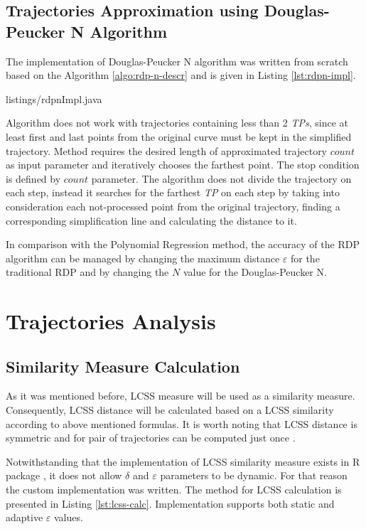 \subsection{Trajectories Approximation using Douglas-Peucker N Algorithm}

The implementation of Douglas-Peucker N algorithm was written from scratch based on the Algorithm \ref{algo:rdp-n-descr} and is given in Listing \ref{lst:rdpn-impl}.

 {listings/rdpnImpl.java}

Algorithm does not work with trajectories containing less than 2 \textit{TPs}, since at least first and last points from the original curve must be kept in the simplified trajectory. Method requires the desired length of approximated trajectory $count$ as input parameter and iteratively chooses the farthest point. The stop condition is defined by $count$ parameter. The algorithm does not divide the trajectory on each step, instead it searches for the farthest \textit{TP} on each step by taking into consideration each not-processed point from the original trajectory, finding a corresponding simplification line and calculating the distance to it. 

In comparison with the Polynomial Regression method, the accuracy of the RDP algorithm can be managed by changing the maximum distance $\varepsilon$ for the traditional RDP and by changing the $N$ value for the Douglas-Peucker N. 

\section{Trajectories Analysis}

\subsection{Similarity Measure Calculation}

As it was mentioned before, LCSS measure will be used as a similarity measure. Consequently, LCSS distance will be calculated based on a LCSS similarity according to above mentioned formulas. It is worth noting that LCSS distance is symmetric and for pair of trajectories can be computed just once \cite{inproceedings:28_lcss_dsmt}.

Notwithstanding that the implementation of LCSS similarity measure exists in R package \cite{online:r_lcss}, it does not allow $\delta$ and $\varepsilon$ parameters to be dynamic. For that reason the custom implementation was written. The method for LCSS calculation is presented in Listing \ref{lst:lcss-calc}. Implementation supports both static and adaptive $\varepsilon$ values.  

